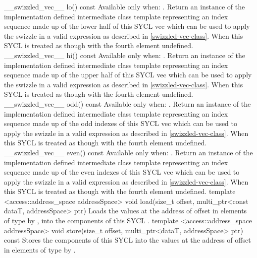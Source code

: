   \addRow
    {\__swizzled_vec__ lo() const}
    {
      Available only when: .
      Return an instance of the implementation defined intermediate class template  representing an index sequence made up of the lower half of this SYCL vec which can be used to apply the swizzle in a valid expression as described in \ref{swizzled-vec-class}. When  this SYCL  is treated as though  with the fourth element undefined.
    }
  \addRow
    {\__swizzled_vec__ hi() const}
    {
      Available only when: .
      Return an instance of the implementation defined intermediate class template  representing an index sequence made up of the upper half of this SYCL vec which can be used to apply the swizzle in a valid expression as described in \ref{swizzled-vec-class}. When  this SYCL  is treated as though  with the fourth element undefined.
    }
  \addRow
    {\__swizzled_vec__ odd() const}
    {
      Available only when: .
      Return an instance of the implementation defined intermediate class template  representing an index sequence made up of the odd indexes of this SYCL vec which can be used to apply the swizzle in a valid expression as described in \ref{swizzled-vec-class}. When  this SYCL  is treated as though  with the fourth element undefined.
    }    
  \addRow
    {\__swizzled_vec__ even() const}
    {
      Available only when: .
      Return an instance of the implementation defined intermediate class template  representing an index sequence made up of the even indexes of this SYCL vec which can be used to apply the swizzle in a valid expression as described in \ref{swizzled-vec-class}. When  this SYCL  is treated as though  with the fourth element undefined.
    }
  \addRowTwoL
  {template <access::address_space addressSpace>}
  {void load(size_t offset, multi_ptr<const dataT, addressSpace> ptr)}
  {
    Loads the values at the address of  offset in elements of type  by , into the components of this SYCL .
  }
  \addRowTwoL
  {template <access::address_space addressSpace>}
  {void store(size_t offset, multi_ptr<dataT, addressSpace> ptr) const}
  {
    Stores the components of this SYCL  into the values at the address of  offset in elements of type  by .
  }

